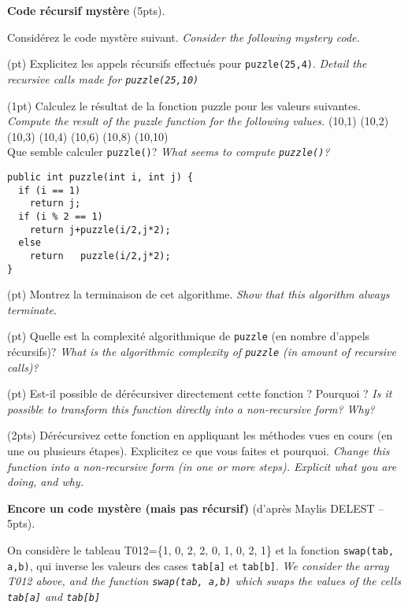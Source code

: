 \documentclass[10pt]{article}\usepackage[nu]{esial}
\begin{document}
\medskip\Exercice\textbf{Code récursif mystère} (5pts). 

Considérez le code mystère suivant. \textit{Consider the following mystery code.}

\noindent\begin{minipage}{.65\linewidth}

\Question(\textonehalf pt) Explicitez les appels récursifs effectués pour 
\texttt{puzzle(25,4)}. \textit{Detail the recursive calls made for \texttt{puzzle(25,10)}}

\Question(1pt) Calculez le résultat de la fonction puzzle pour les valeurs
suivantes. \textit{Compute the result of the puzzle function for the following
  values.}
(10,1) (10,2) (10,3) (10,4) (10,6) (10,8) (10,10)\\
Que semble calculer \texttt{puzzle()}? \textit{What seems to compute
  \texttt{puzzle()}?}

\end{minipage}\hfill
\begin{minipage}{.33\linewidth}
\begin{Verbatim}[numbers=right]
public int puzzle(int i, int j) {
  if (i == 1)     
    return j;
  if (i % 2 == 1)
    return j+puzzle(i/2,j*2);
  else 
    return   puzzle(i/2,j*2);
}
\end{Verbatim}
\end{minipage}

\Question(\textonehalf pt)  Montrez la terminaison de cet algorithme. \textit{Show that
  this algorithm always terminate.}

\Question(\textonehalf pt) Quelle est la complexité algorithmique de \texttt{puzzle} (en
nombre d'appels récursifs)? \textit{What is the algorithmic complexity of
  \texttt{puzzle} (in amount of recursive calls)?}

\Question(\textonehalf pt) Est-il possible de dérécursiver directement cette
fonction ? Pourquoi ? \textit{Is it possible to transform this function
  directly into a non-recursive form? Why?}

\Question(2pts) Dérécursivez cette fonction en appliquant les méthodes vues en cours
(en une ou plusieurs étapes). Explicitez ce que vous faites et
pourquoi. \textit{Change this function into a non-recursive form (in one or
  more steps). Explicit what you are doing, and why.}

\medskip\Exercice\textbf{Encore un code mystère (mais pas récursif)} (d'après
Maylis DELEST -- 5pts).

On considère le tableau T012=\{1, 0, 2, 2, 0, 1, 0, 2, 1\} et la fonction
\texttt{swap(tab, a,b)}, qui inverse les valeurs des cases \texttt{tab[a]} et
\texttt{tab[b]}. \textit{We consider the array T012 above, and the function
  \texttt{swap(tab, a,b)} which swaps the values of the cells \texttt{tab[a]}
  and \texttt{tab[b]}}
\end{document}

